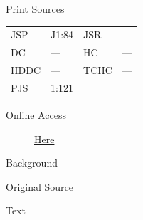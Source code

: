 			\begin{description}
				\item[Print Sources]
			\end{description}

				\begin{tabular}{p{0.5in}p{1in}p{0.5in}p{1in}}
				JSP	 	& J1:84			& JSR 		& ---  \\
				DC	 	& --- 			& HC 		& ---  \\
				HDDC 	& ---			& TCHC 		& ---  \\
				PJS 	& 1:121			& 	 		&  \\
				\end{tabular}
			
			\begin{description}
				\item[Online Access] \href{https://www.josephsmithpapers.org/paper-summary/journal-1835-1836/20}{Here}
			\end{description}
			
			\begin{description}
				\item[Background]
			\end{description}
			
			
			\begin{description}
				\item[Original Source]
			\end{description}
			
			
			\begin{description}
				\item[Text]
			\end{description}
			
